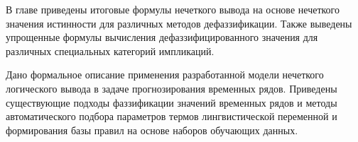 
В главе приведены итоговые формулы нечеткого вывода на основе нечеткого значения истинности для различных методов дефаззификации. Также выведены упрощенные формулы вычисления дефаззифицированного значения для различных специальных категорий импликаций.

Дано формальное описание применения разработанной модели нечеткого логического вывода в задаче прогнозирования временных рядов. Приведены существующие подходы фаззификации значений временных рядов и методы автоматического подбора параметров термов лингвистической переменной и формирования базы правил на основе наборов обучающих данных.

\FloatBarrier
